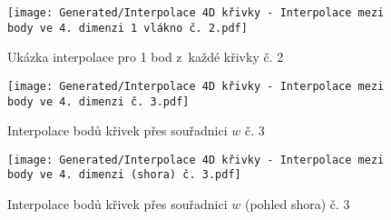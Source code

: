 \begin{imagepage}
    \begin{figure}[H]
        \centering
        \texttt{[image: Generated/Interpolace 4D křivky - Interpolace mezi body ve 4. dimenzi 1 vlákno č. 2.pdf]}
        \caption{Ukázka interpolace pro 1 bod z~každé křivky č. 2}
        \label{fig:Demo 4D Interpolace mezi body přes souřadnici w konst x 2}
    \end{figure}
\end{imagepage}
\begin{imagepage}
    \begin{figure}[H]
        \centering
        \texttt{[image: Generated/Interpolace 4D křivky - Interpolace mezi body ve 4. dimenzi č. 3.pdf]}
        \caption{Interpolace bodů křivek přes souřadnici $w$ č. 3 }
        \label{fig:Demo 4D Interpolace mezi body přes souřadnici w 3}
    \end{figure}
    \begin{figure}[H]
        \centering
        \texttt{[image: Generated/Interpolace 4D křivky - Interpolace mezi body ve 4. dimenzi (shora) č. 3.pdf]}
        \caption{Interpolace bodů křivek přes souřadnici $w$ (pohled shora) č. 3}
        \label{fig:Demo 4D Interpolace mezi body přes souřadnici w shora 3}
    \end{figure}
\end{imagepage}


